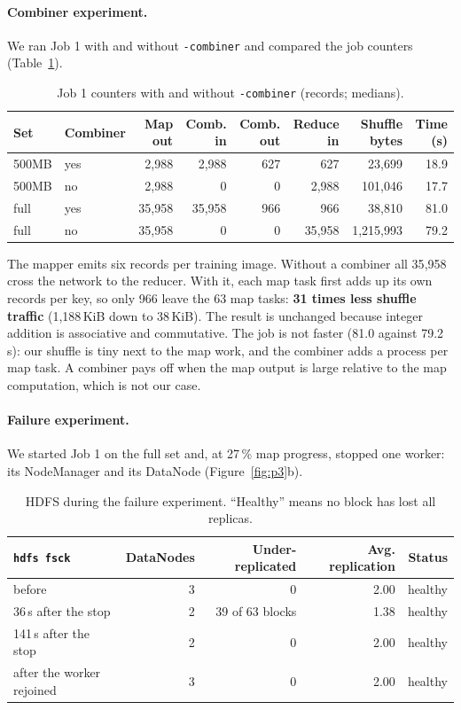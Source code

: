 \documentclass{zc-ust-hw}
\begin{document}
\paragraph{Combiner experiment.} We ran Job 1 with and without \texttt{-combiner} and compared
the job counters (Table~\ref{tab:combiner}).

\begin{table}[H]
\centering\small\setlength{\tabcolsep}{4.5pt}
\begin{tabular}{llrrrrrr}
\toprule
Set & Combiner & Map out & Comb. in & Comb. out & Reduce in & Shuffle bytes & Time (s) \\
\midrule
500MB & yes & 2{,}988 & 2{,}988 & 627 & 627 & 23{,}699 & 18.9 \\
500MB & no & 2{,}988 & 0 & 0 & 2{,}988 & 101{,}046 & 17.7 \\
full & yes & 35{,}958 & 35{,}958 & 966 & 966 & 38{,}810 & 81.0 \\
full & no & 35{,}958 & 0 & 0 & 35{,}958 & 1{,}215{,}993 & 79.2 \\
\bottomrule
\end{tabular}
\caption{Job 1 counters with and without \texttt{-combiner} (records; medians).}
\label{tab:combiner}
\end{table}

The mapper emits six records per training image. Without a combiner all 35{,}958 cross the
network to the reducer. With it, each map task first adds up its own records per key, so only
966 leave the 63 map tasks: \textbf{31 times less shuffle traffic} (1{,}188\,KiB down to
38\,KiB). The result is unchanged because integer addition is associative and commutative. The
job is not faster (81.0 against 79.2\,s): our shuffle is tiny next to the map work, and the
combiner adds a process per map task. A combiner pays off when the map output is large relative
to the map computation, which is not our case.

\paragraph{Failure experiment.} We started Job 1 on the full set and, at 27\,\% map progress,
stopped one worker: its NodeManager and its DataNode (Figure~\ref{fig:p3}b).

\begin{table}[H]
\centering\small
\begin{tabular}{lrrrr}
\toprule
\texttt{hdfs fsck} & DataNodes & Under-replicated & Avg. replication & Status \\
\midrule
before & 3 & 0 & 2.00 & healthy \\
36\,s after the stop & 2 & 39 of 63 blocks & 1.38 & healthy \\
141\,s after the stop & 2 & 0 & 2.00 & healthy \\
after the worker rejoined & 3 & 0 & 2.00 & healthy \\
\bottomrule
\end{tabular}
\caption{HDFS during the failure experiment. ``Healthy'' means no block has lost all replicas.}
\end{table}
\end{document}
